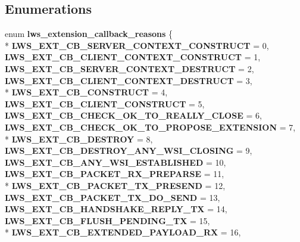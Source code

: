 \subsection*{Enumerations}
\begin{DoxyCompactItemize}
\item 
enum {\bfseries lws\+\_\+extension\+\_\+callback\+\_\+reasons} \{ \\*
{\bfseries L\+W\+S\+\_\+\+E\+X\+T\+\_\+\+C\+B\+\_\+\+S\+E\+R\+V\+E\+R\+\_\+\+C\+O\+N\+T\+E\+X\+T\+\_\+\+C\+O\+N\+S\+T\+R\+U\+CT} = 0, 
{\bfseries L\+W\+S\+\_\+\+E\+X\+T\+\_\+\+C\+B\+\_\+\+C\+L\+I\+E\+N\+T\+\_\+\+C\+O\+N\+T\+E\+X\+T\+\_\+\+C\+O\+N\+S\+T\+R\+U\+CT} = 1, 
{\bfseries L\+W\+S\+\_\+\+E\+X\+T\+\_\+\+C\+B\+\_\+\+S\+E\+R\+V\+E\+R\+\_\+\+C\+O\+N\+T\+E\+X\+T\+\_\+\+D\+E\+S\+T\+R\+U\+CT} = 2, 
{\bfseries L\+W\+S\+\_\+\+E\+X\+T\+\_\+\+C\+B\+\_\+\+C\+L\+I\+E\+N\+T\+\_\+\+C\+O\+N\+T\+E\+X\+T\+\_\+\+D\+E\+S\+T\+R\+U\+CT} = 3, 
\\*
{\bfseries L\+W\+S\+\_\+\+E\+X\+T\+\_\+\+C\+B\+\_\+\+C\+O\+N\+S\+T\+R\+U\+CT} = 4, 
{\bfseries L\+W\+S\+\_\+\+E\+X\+T\+\_\+\+C\+B\+\_\+\+C\+L\+I\+E\+N\+T\+\_\+\+C\+O\+N\+S\+T\+R\+U\+CT} = 5, 
{\bfseries L\+W\+S\+\_\+\+E\+X\+T\+\_\+\+C\+B\+\_\+\+C\+H\+E\+C\+K\+\_\+\+O\+K\+\_\+\+T\+O\+\_\+\+R\+E\+A\+L\+L\+Y\+\_\+\+C\+L\+O\+SE} = 6, 
{\bfseries L\+W\+S\+\_\+\+E\+X\+T\+\_\+\+C\+B\+\_\+\+C\+H\+E\+C\+K\+\_\+\+O\+K\+\_\+\+T\+O\+\_\+\+P\+R\+O\+P\+O\+S\+E\+\_\+\+E\+X\+T\+E\+N\+S\+I\+ON} = 7, 
\\*
{\bfseries L\+W\+S\+\_\+\+E\+X\+T\+\_\+\+C\+B\+\_\+\+D\+E\+S\+T\+R\+OY} = 8, 
{\bfseries L\+W\+S\+\_\+\+E\+X\+T\+\_\+\+C\+B\+\_\+\+D\+E\+S\+T\+R\+O\+Y\+\_\+\+A\+N\+Y\+\_\+\+W\+S\+I\+\_\+\+C\+L\+O\+S\+I\+NG} = 9, 
{\bfseries L\+W\+S\+\_\+\+E\+X\+T\+\_\+\+C\+B\+\_\+\+A\+N\+Y\+\_\+\+W\+S\+I\+\_\+\+E\+S\+T\+A\+B\+L\+I\+S\+H\+ED} = 10, 
{\bfseries L\+W\+S\+\_\+\+E\+X\+T\+\_\+\+C\+B\+\_\+\+P\+A\+C\+K\+E\+T\+\_\+\+R\+X\+\_\+\+P\+R\+E\+P\+A\+R\+SE} = 11, 
\\*
{\bfseries L\+W\+S\+\_\+\+E\+X\+T\+\_\+\+C\+B\+\_\+\+P\+A\+C\+K\+E\+T\+\_\+\+T\+X\+\_\+\+P\+R\+E\+S\+E\+ND} = 12, 
{\bfseries L\+W\+S\+\_\+\+E\+X\+T\+\_\+\+C\+B\+\_\+\+P\+A\+C\+K\+E\+T\+\_\+\+T\+X\+\_\+\+D\+O\+\_\+\+S\+E\+ND} = 13, 
{\bfseries L\+W\+S\+\_\+\+E\+X\+T\+\_\+\+C\+B\+\_\+\+H\+A\+N\+D\+S\+H\+A\+K\+E\+\_\+\+R\+E\+P\+L\+Y\+\_\+\+TX} = 14, 
{\bfseries L\+W\+S\+\_\+\+E\+X\+T\+\_\+\+C\+B\+\_\+\+F\+L\+U\+S\+H\+\_\+\+P\+E\+N\+D\+I\+N\+G\+\_\+\+TX} = 15, 
\\*
{\bfseries L\+W\+S\+\_\+\+E\+X\+T\+\_\+\+C\+B\+\_\+\+E\+X\+T\+E\+N\+D\+E\+D\+\_\+\+P\+A\+Y\+L\+O\+A\+D\+\_\+\+RX} = 16, 

\end{DoxyCompactItemize}
